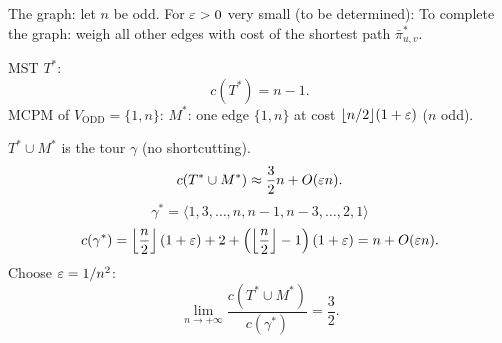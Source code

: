 The graph: let $n$ be odd. For $\varepsilon>0$ very small (to be determined):
To complete the graph: weigh all other edges with cost of the shortest path $\bar\pi^*_{u,v}$.

MST $T^*$:
\[c(T^*)=n-1.\]
MCPM of $V_{\mathrm{ODD}}=\{1,n\}$:
$M^*$: one edge $\{1,n\}$ at cost $\lfloor n/2\rfloor(1+\varepsilon)$ ($n$ odd).

$T^*\cup M^*$ is the tour $\gamma$ (no shortcutting).
\[c(T^*\cup M^*)\approx\frac32n+O(\varepsilon n).\]
\[\gamma^*=\langle1,3,\ldots,n,n-1,n-3,\ldots,2,1\rangle\]
\[c(\gamma^*)=\left\lfloor\frac n2\right\rfloor(1+\varepsilon)+2+
\left(\left\lfloor\frac n2\right\rfloor-1\right)(1+\varepsilon)=n+O(\varepsilon n).\]
Choose $\varepsilon=1/n^2$:
\[\lim_{n\to+\infty}\frac{c(T^*\cup M^*)}{c(\gamma^*)}=\frac32.\]
